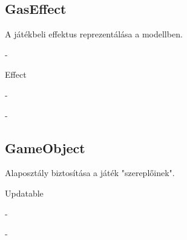 \subsection{GasEffect}
\begin{class-template-responsibility}
    A játékbeli effektus reprezentálása a modellben.
\end{class-template-responsibility}
\begin{class-template-interface}
    -
\end{class-template-interface}
\begin{class-template-baseclass}
    Effect
\end{class-template-baseclass}
\begin{class-template-attribute}
    -
\end{class-template-attribute}
\begin{class-template-method}
    -
\end{class-template-method}

\subsection{GameObject}
\begin{class-template-responsibility}
    Alaposztály biztosítása a játék "szereplőinek".
\end{class-template-responsibility}
\begin{class-template-interface}
    Updatable
\end{class-template-interface}
\begin{class-template-baseclass}
    -
\end{class-template-baseclass}
\begin{class-template-attribute}
    -
\end{class-template-attribute}
\begin{class-template-method}
\end{class-template-method}


